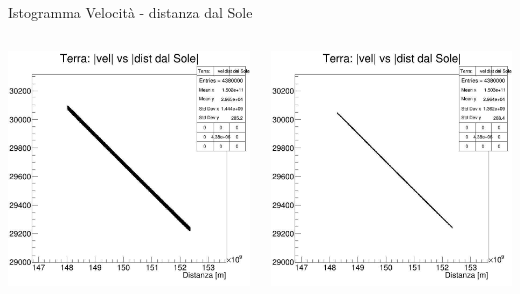         \begin{frame}{Istogramma Velocità - distanza dal Sole}
            \begin{columns}
                    \centering
                    \includegraphics[width=.9\textwidth]{5_distanza/terra_vds_solefisso_luna.jpg}
                    \caption{Con il Sole fisso e la Luna}
                    \centering
                    \includegraphics[width=.9\textwidth]{5_distanza/terra_vds_solefisso_noluna.jpg}
                    \caption{Con il Sole fisso e senza Luna}
            \end{columns}
        \end{frame}
        
